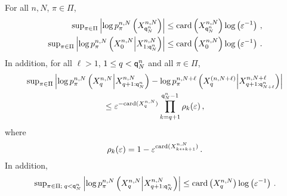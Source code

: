 \begin{lemma}
\label{lem:exp:forget}
For all $n,N$, $\pi\in\Pi$,
\begin{align}
\mathrm{sup}_{\pi\in\Pi}\left|\log p_{\pi}^{n,N}\left(X_{{\mathsf{q}}^{n}_{N}}^{n,N}\right)\right|&\le \mathrm{card}\left(X_{{\mathsf{q}}^{n}_{N}}^{n,N}\right)\log \left(\varepsilon^{-1}\right)\,,\label{eq:bound:beg}\\
\mathrm{sup}_{\pi\in\Pi}\left|\log p_{\pi}^{n,N}\left(X_{0}^{n,N}\middle|X_{1:{\mathsf{q}}^{n}_{N}}^{n,N}\right)\right|&\le \mathrm{card}\left(X_{0}^{n,N}\right)\log \left(\varepsilon^{-1}\right)\label{eq:bound:end}\,.
\end{align}
In addition,  for all $\ell>1$,  $1\le q< {\mathsf{q}}^{n}_{N}$ and all $\pi\in\Pi$,
\begin{multline}
\mathrm{sup}_{\pi\in\Pi}\left|\log p_{\pi}^{n,N}\left(X_{q}^{n,N}\middle|X_{q+1:{\mathsf{q}}^{n}_{N}}^{n,N}\right) - \log p_{\pi}^{n,N+\ell}\left(X_{q}^{(n,N+\ell)}\middle|X_{q+1:{\mathsf{q}}^{n}_{N+\ell}}^{n,N+\ell}\right) \right|\\
\leq \varepsilon^{-\mathrm{card}(X^{n,N}_{q})}\prod_{k=q+1}^{{\mathsf{q}}^{n}_{N}-1}\rho_k(\varepsilon) \,,\label{eq:bound:forget}
\end{multline}
where
\begin{equation}
\label{eq:defrho}
\rho_k(\varepsilon) = 1- \varepsilon^{\mathrm{card}(X^{n,N}_{k\leftrightarrow k+1})}\,.
\end{equation}
In addition,
\begin{equation}
\label{eq:bound:loglik}
\mathrm{sup}_{\pi\in\Pi;\;q< {\mathsf{q}}^{n}_{N}}\left|\log p_{\pi}^{n,N}\left(X_{q}^{n,N}\middle|X_{q+1:{\mathsf{q}}^{n}_{N}}^{n,N}\right)\right|\le \mathrm{card}\left(X_{q}^{n,N}\right)\log \left(\varepsilon^{-1}\right)\,. 
\end{equation}
\end{lemma}

